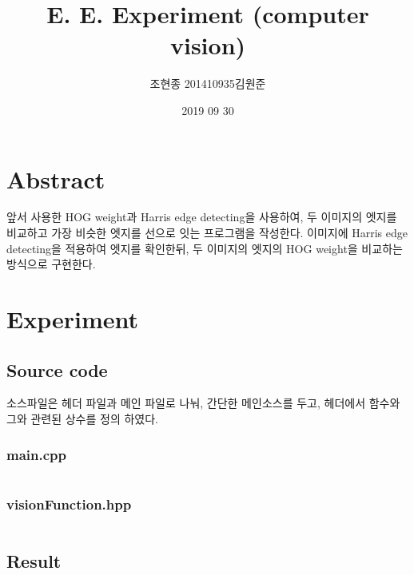 \documentclass[a4paper]{article}
\begin{document}
\title{E. E. Experiment (computer vision)}
\author{조현종 201410935 김원준}
\date{2019 09 30}
\maketitle

\section{Abstract}
앞서 사용한 HOG weight과 Harris edge detecting을 사용하여, 두 이미지의 엣지를 비교하고 가장 비슷한 엣지를 선으로 잇는 프로그램을 작성한다. 이미지에 Harris edge detecting을 적용하여 엣지를 확인한뒤, 두 이미지의 엣지의 HOG weight을 비교하는 방식으로 구현한다.
\section{Experiment}
\subsection{Source code}
소스파일은 헤더 파일과 메인 파일로 나눠, 간단한 메인소스를 두고, 헤더에서 함수와 그와 관련된 상수를 정의 하였다.

\subsubsection{main.cpp}

{\footnotesize
\begin{spacing}{0.8}
    \inputminted[linenos=true, breaklines]{cpp}{assign.cpp}
\end{spacing}
}

\subsubsection{visionFunction.hpp}

{\footnotesize
\begin{spacing}{0.8}
    \inputminted[linenos=true, breaklines]{cpp}{visionFunctions.hpp}
\end{spacing}
}

\subsection{Result}
\end{document}
